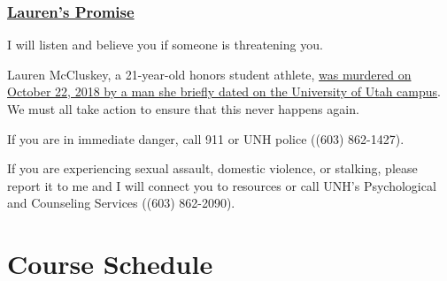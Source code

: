 \documentclass[
  letterpaper,
  DIV=11,
  numbers=noendperiod]{scrreprt}
\begin{document}
\hypertarget{laurens-promise}{%
\subsection*{\texorpdfstring{\href{https://laurenmccluskey.org/laurens-promise/}{Lauren's
Promise}}{Lauren's Promise}}\label{laurens-promise}}

I will listen and believe you if someone is threatening you.

Lauren McCluskey, a 21-year-old honors student athlete,
\href{https://www.sltrib.com/opinion/commentary/2019/02/10/commentary-failing-lauren/}{was
murdered on October 22, 2018 by a man she briefly dated on the
University of Utah campus}. We must all take action to ensure that this
never happens again.

If you are in immediate danger, call 911 or UNH police ((603) 862-1427).

If you are experiencing sexual assault, domestic violence, or stalking,
please report it to me and I will connect you to resources or call UNH's
Psychological and Counseling Services ((603) 862-2090).


\hypertarget{course-schedule}{%
\chapter*{Course Schedule}\label{course-schedule}}

\end{document}
